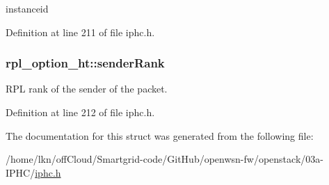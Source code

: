 instanceid 



Definition at line 211 of file iphc.\+h.

\subsubsection[{\texorpdfstring{sender\+Rank}{senderRank}}]{ rpl\+\_\+option\+\_\+ht\+::sender\+Rank}\hypertarget{structrpl__option__ht_afef2aed4e368e0b68c8e9337f0ea1723}{}\label{structrpl__option__ht_afef2aed4e368e0b68c8e9337f0ea1723}


R\+PL rank of the sender of the packet. 



Definition at line 212 of file iphc.\+h.



The documentation for this struct was generated from the following file\+:\begin{DoxyCompactItemize}
\item 
/home/lkn/off\+Cloud/\+Smartgrid-\/code/\+Git\+Hub/openwsn-\/fw/openstack/03a-\/\+I\+P\+H\+C/\hyperlink{iphc_8h}{iphc.\+h}\end{DoxyCompactItemize}
